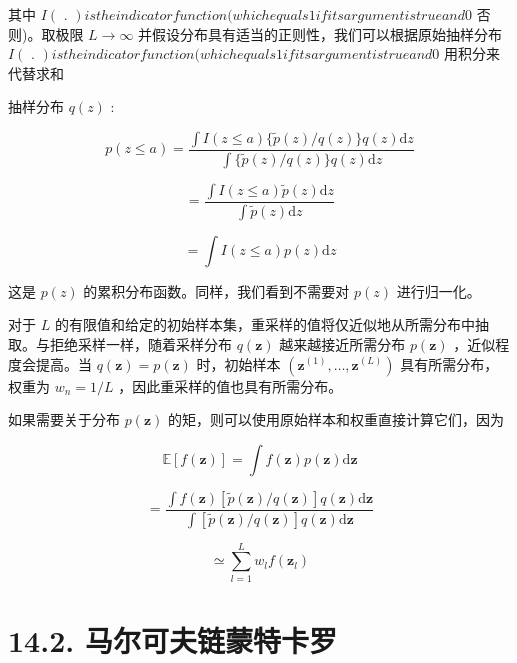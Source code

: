 \documentclass[10pt]{article}
\begin{document}
其中 \(I\left( \text{ . }\right) {istheindicatorfunction}({whichequals1ifitsargumentistrueand0}\) 否则)。取极限 \(L \rightarrow  \infty\) 并假设分布具有适当的正则性，我们可以根据原始抽样分布 \(I\left( \text{ . }\right) {istheindicatorfunction}({whichequals1ifitsargumentistrueand0}\) 用积分来代替求和

抽样分布 \(q\left( z\right)\) :

\[
p\left( {z \leq  a}\right)  = \frac{\int I\left( {z \leq  a}\right) \{ \widetilde{p}\left( z\right) /q\left( z\right) \} q\left( z\right) \mathrm{d}z}{\int \{ \widetilde{p}\left( z\right) /q\left( z\right) \} q\left( z\right) \mathrm{d}z}
\]

\[
= \frac{\int I\left( {z \leq  a}\right) \widetilde{p}\left( z\right) \mathrm{d}z}{\int \widetilde{p}\left( z\right) \mathrm{d}z}
\]

\[
= \int I\left( {z \leq  a}\right) p\left( z\right) \mathrm{d}z \tag{14.25}
\]

这是 \(p\left( z\right)\) 的累积分布函数。同样，我们看到不需要对 \(p\left( z\right)\) 进行归一化。

对于 \(L\) 的有限值和给定的初始样本集，重采样的值将仅近似地从所需分布中抽取。与拒绝采样一样，随着采样分布 \(q\left( \mathbf{z}\right)\) 越来越接近所需分布 \(p\left( \mathbf{z}\right)\) ，近似程度会提高。当 \(q\left( \mathbf{z}\right)  = p\left( \mathbf{z}\right)\) 时，初始样本 \(\left( {{\mathbf{z}}^{\left( 1\right) },\ldots ,{\mathbf{z}}^{\left( L\right) }}\right)\) 具有所需分布，权重为 \({w}_{n} = 1/L\) ，因此重采样的值也具有所需分布。

如果需要关于分布 \(p\left( \mathbf{z}\right)\) 的矩，则可以使用原始样本和权重直接计算它们，因为

\[
\mathbb{E}\left\lbrack  {f\left( \mathbf{z}\right) }\right\rbrack   = \int f\left( \mathbf{z}\right) p\left( \mathbf{z}\right) \mathrm{d}\mathbf{z}
\]

\[
= \frac{\int f\left( \mathbf{z}\right) \left\lbrack  {\widetilde{p}\left( \mathbf{z}\right) /q\left( \mathbf{z}\right) }\right\rbrack  q\left( \mathbf{z}\right) \mathrm{d}\mathbf{z}}{\int \left\lbrack  {\widetilde{p}\left( \mathbf{z}\right) /q\left( \mathbf{z}\right) }\right\rbrack  q\left( \mathbf{z}\right) \mathrm{d}\mathbf{z}}
\]

\[
\simeq  \mathop{\sum }\limits_{{l = 1}}^{L}{w}_{l}f\left( {\mathbf{z}}_{l}\right)  \tag{14.26}
\]

\section*{14.2. 马尔可夫链蒙特卡罗}
\end{document}
